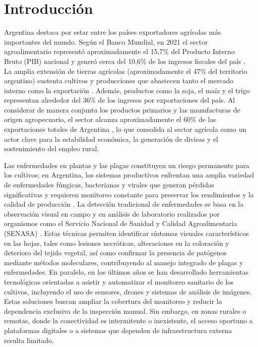 \chapter{Introducción}

Argentina destaca por estar entre los países exportadores agrícolas más importantes del mundo. Según el Banco Mundial, en 2021 el sector agroalimentario
representó aproximadamente el 15,7\% del Producto Interno Bruto (PIB) nacional y generó cerca del 10,6\% de los ingresos fiscales del país \cite{worldbank2024agricultura}. 
La amplia extensión de tierras agrícolas (aproximadamente el 47\% del territorio argentino) sustenta cultivos y producciones que abastecen 
tanto el mercado interno como la exportación \cite{usda2024argentina}. Además, productos como la soja, el maíz y el trigo representan alrededor del 36\% de los ingresos
por exportaciones del país. Al considerar de manera conjunta los productos primarios y las manufacturas de origen agropecuario, el sector alcanza 
aproximadamente el 60\% de las exportaciones totales de Argentina \cite{millermagazine2024argentina}, lo que consolida al sector agrícola como un actor clave para la estabilidad 
económica, la generación de divisas y el sostenimiento del empleo rural.

Las enfermedades en plantas y las plagas constituyen un riesgo permanente   
para los cultivos; en Argentina, los sistemas productivos enfrentan una amplia variedad de enfermedades fúngicas, bacterianas y virales que generan
pérdidas significativas y requieren monitoreo constante para preservar los rendimientos y la calidad de producción \cite{aapresid2024maiz}. La detección tradicional de 
enfermedades se basa en la observación visual en campo y en análisis de laboratorio realizados por organismos como el Servicio Nacional de Sanidad y
Calidad Agroalimentaria (SENASA) \cite{argentina2024laboratorio}.  Estas técnicas permiten identificar síntomas visuales característicos en las hojas, tales como lesiones
necróticas, alteraciones en la coloración y deterioro del tejido vegetal, así como confirmar la presencia de patógenos mediante métodos moleculares,
contribuyendo al manejo integrado de plagas y enfermedades. En paralelo, en los últimos años se han desarrollado herramientas tecnológicas 
orientadas a asistir y automatizar el monitoreo sanitario de los cultivos, incluyendo el uso de sensores, drones y sistemas de análisis de imágenes.
Estas soluciones buscan ampliar la cobertura del monitoreo y reducir la dependencia exclusiva de la inspección manual. Sin embargo, en zonas rurales 
o remotas, donde la conectividad es intermitente o inexistente, el acceso oportuno a plataformas digitales o a sistemas que dependen de infraestructura
externa resulta limitado.


